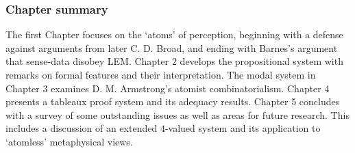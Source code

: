 \subsubsection*{Chapter summary}
The first Chapter focuses on the `atoms' of perception, beginning with a defense against arguments from later C. D. Broad, and ending with Barnes's argument that sense-data disobey LEM. Chapter 2 develops the propositional system with remarks on formal features and their interpretation. The modal system in Chapter 3 examines D. M. Armstrong's atomist combinatorialism. Chapter 4 presents a tableaux proof system and its adequacy results. Chapter 5 concludes with a survey of some outstanding issues as well as areas for future research. This includes a discussion of an extended $4$-valued system and its application to `atomless' metaphysical views.


 
%
%
%

